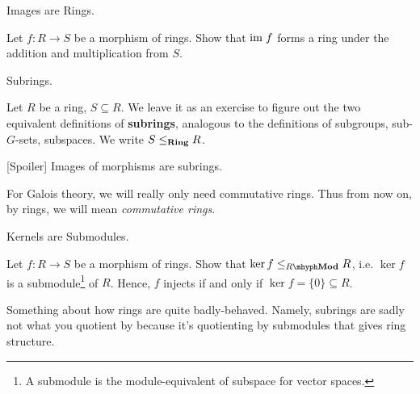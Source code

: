 \documentclass[../book.tex]{subfiles}
\begin{document}
\begin{ex} [Important] Images are Rings. 

    Let $f : R \to S$ be a morphism of rings. 
    Show that $\textnormal{im}\; f$ forms a ring under the addition and multiplication from $S$. 
\end{ex}

\begin{dfn} Subrings. 

    Let $R$ be a ring, $S \subseteq R$. 
    We leave it as an exercise to figure out the two equivalent definitions
    of \textbf{subrings}, analogous to 
    the definitions of subgroups, sub-$G$-sets, subspaces. 
    We write $S \leq_{\mathbf{Ring}} R$.
    
    [Spoiler] Images of morphisms are subrings. 
\end{dfn}

\begin{rmk}
    For Galois theory, we will really only need commutative rings. 
    Thus from now on, by rings, we will mean \emph{commutative rings}. 
\end{rmk}

\begin{ex} [Important] Kernels are Submodules.

    Let $f : R \to S$ be a morphism of rings. 
    Show that $\ker f \leq_{\RMod} R$, i.e. 
    $\ker f$ is a submodule\footnote{
    A submodule is the module-equivalent of subspace for vector spaces.} of $R$.
    Hence, $f$ injects if and only if $\ker f = \{0\} \subseteq R$.  
\end{ex}

\begin{rmk} 
    Something about how rings are quite badly-behaved.
    Namely, subrings are sadly not what you quotient by
    because it's quotienting by submodules that gives ring structure. 
\end{rmk}
\end{document}
